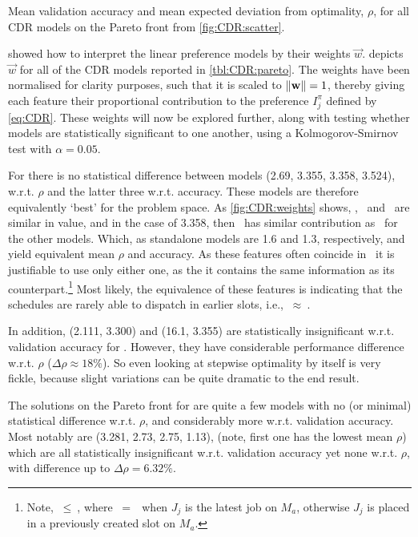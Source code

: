 \begin{table}
  \caption{Mean validation accuracy and mean expected deviation from 
    optimality, $\rho$, for all CDR models on the Pareto front from 
    \cref{fig:CDR:scatter}.}\label{tbl:CDR:pareto}
  
\end{table}

 showed how to interpret the linear preference models 
by their weights $\vec{w}$.  depicts $\vec{w}$ for all of 
the CDR models reported in \cref{tbl:CDR:pareto}. 
The weights have been normalised for clarity purposes, such that it is scaled 
to $\lVert\mathbf{w}\rVert=1$, thereby giving each feature their proportional 
contribution to the preference $I_j^{\pi}$ defined by \cref{eq:CDR}. 
These weights will now be explored further, along with testing whether models 
are statistically significant to one another, using a 
Kolmogorov-Smirnov test with $\alpha=0.05$.

For   there is no statistical difference between models (2.69, 
3.355, 3.358, 3.524), w.r.t. $\rho$ and the latter three w.r.t. 
accuracy. These models are therefore equivalently `best' for the problem space.
As \cref{fig:CDR:weights} shows, \phiendTime, \phijobWrm\ and \phimacWrm\ are 
similar in value, and in the case of 3.358, then \phimacFree\ has similar 
contribution as \phiendTime\ for the other models. 
Which, as standalone models are 1.6 and 1.3, respectively, and yield 
equivalent mean $\rho$ and accuracy.
As these features often coincide in \jsp\, it is justifiable to use only 
either one, as the it contains the same information as its 
counterpart.\footnote{Note, \phiendTime$~\leq~$\phimacFree, where
  \phiendTime$~=~$\phimacFree\ when $J_j$ is the latest job on $M_a$, 
  otherwise $J_j$ is placed in a previously created slot on $M_a$.}
Most likely, the equivalence of these features is indicating that the 
schedules are rarely able to dispatch in earlier slots, i.e., 
\phiendTime$~\approx~$\phimacFree. 

In addition, (2.111, 3.300) and (16.1, 3.355) are statistically insignificant 
w.r.t. validation accuracy for . However, they have considerable 
performance difference w.r.t. $\rho$ ($\Delta\rho \approx 18\%$). 
So even looking at stepwise optimality by itself is very fickle, because slight 
variations can be quite dramatic to the end result. 

The solutions on the Pareto front for  are quite a few models
with no (or minimal) statistical difference w.r.t. $\rho$, and 
considerably more w.r.t. validation accuracy. 
Most notably are (3.281, 2.73, 2.75, 1.13), 
(note, first one has the lowest mean $\rho$) which are all statistically 
insignificant w.r.t. validation accuracy yet none w.r.t. $\rho$, with 
difference up to $\Delta\rho=6.32\%$.

